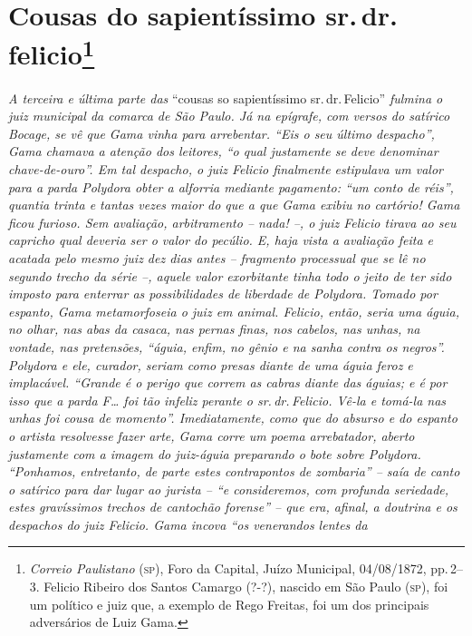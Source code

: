 \chapter{Cousas do sapientíssimo sr.\,dr.\,felicio\footnote{\emph{Correio Paulistano} (\textsc{sp}), Foro da Capital, Juízo
  Municipal, 04/08/1872, pp.\,2--3. Felicio Ribeiro dos Santos Camargo
  (?-?), nascido em São Paulo (\textsc{sp}), foi um político e juiz que, a
  exemplo de Rego Freitas, foi um dos principais adversários de Luiz
  Gama.}} %

\begin{didascalia}
\emph{A terceira e última parte das} ``cousas so sapientíssimo sr.\,dr.\,Felicio'' \emph{fulmina o juiz municipal da comarca de São Paulo. Já na
epígrafe, com versos do satírico Bocage, se vê que Gama vinha para
arrebentar. ``Eis o seu último despacho'', Gama chamava a atenção dos
leitores, ``o qual justamente se deve denominar chave-de-ouro''. Em tal
despacho, o juiz Felicio finalmente estipulava um valor para a parda
Polydora obter a alforria mediante pagamento: ``um conto de réis'',
quantia trinta e tantas vezes maior do que a que Gama exibiu no
cartório! Gama ficou furioso. Sem avaliação, arbitramento -- nada! --, o
juiz Felicio tirava ao seu capricho qual deveria ser o valor do pecúlio.
E, haja vista a avaliação feita e acatada pelo mesmo juiz dez dias antes
-- fragmento processual que se lê no segundo trecho da série --, aquele
valor exorbitante tinha todo o jeito de ter sido imposto para enterrar
as possibilidades de liberdade de Polydora. Tomado por espanto, Gama
metamorfoseia o juiz em animal. Felicio, então, seria uma águia, no
olhar, nas abas da casaca, nas pernas finas, nos cabelos, nas unhas, na
vontade, nas pretensões, ``águia, enfim, no gênio e na sanha contra os
negros''. Polydora e ele, curador, seriam como presas diante de uma águia
feroz e implacável. ``Grande é o perigo que correm as cabras diante das
águias; e é por isso que a parda F\ldots{} foi tão infeliz perante o sr.\,dr.\,Felicio. Vê-la e tomá-la nas unhas foi cousa de momento''. Imediatamente,
como que do absurso e do espanto o artista resolvesse fazer arte, Gama
corre um poema arrebatador, aberto justamente com a imagem do juiz-águia
preparando o bote sobre Polydora. ``Ponhamos, entretanto, de parte estes
contrapontos de zombaria'' -- saía de canto o satírico para dar lugar ao
jurista -- ``e consideremos, com profunda seriedade, estes gravíssimos
trechos de cantochão forense'' -- que era, afinal, a doutrina e os
despachos do juiz Felicio. Gama incova ``os venerandos lentes da
}
\end{didascalia}
